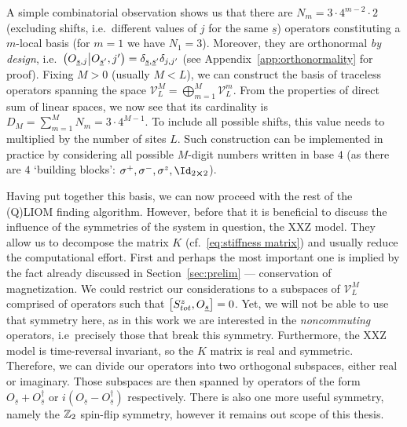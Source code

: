 A simple combinatorial observation shows us that there are \(N_m = 3\cdot 4^{m-2}\cdot 2\)
(excluding shifts, i.e.\ different values of \(j\) for the same \(\underline{s}\)) operators
constituting a \(m\)-local basis (for \(m = 1\) we have \(N_1 = 3\)). Moreover, they are orthonormal
\textit{by design}, i.e.\ \(\left(O_{\underline{s},j} \middle| O_{\underline{s}^{\prime}},j^{\prime}\right) =
\delta_{\underline{s},\underline{s}^{\prime}}\delta_{j,j^{\prime}}\) (see Appendix~\ref{app:orthonormality} for proof).
Fixing \(M>0\) (usually \(M<L\)), we can construct the basis of traceless operators spanning
the space \(\mathcal{V}_L^M = \bigoplus_{m=1}^{M} \mathcal{V}_L^m\). From the properties of 
direct sum of linear spaces, we now see that its cardinality is \(D_M = \sum_{m=1}^{M} N_m = 
 3 \cdot 4^{M-1}\). To include all possible shifts, this value needs to multiplied by
 the number of sites \(L\). Such construction can be implemented in practice by considering
 all possible \(M\)-digit numbers written in base \(4\) (as there are \(4\) `building blocks':
  \(\sigma^{+},\sigma^{-},\sigma^{z},\Id_{2\cross 2}\)). 

Having put together this basis, we can now proceed with the rest of the (Q)LIOM finding algorithm.
However, before that it is beneficial to discuss the influence of the symmetries of the system in question,
the XXZ model. They allow us to decompose the matrix \(K\) 
(cf.~\eqref{eq:stiffness matrix}) and usually reduce the computational effort. First and perhaps
the most important one is implied by the fact already discussed in Section~\ref{sec:prelim} ---
conservation of magnetization. We could restrict our considerations to a subspaces
of \(\mathcal{V}_L^M\) comprised of operators such that \(\comm{S_{tot}^z}{O_{\underline{s}}} = 0\).
Yet, we will not be able to use that symmetry here, as in this work we are interested 
in the \textit{noncommuting} operators, i.e\ precisely those that break this symmetry.
Furthermore, the XXZ model is time-reversal invariant, so the \(K\) matrix is real and symmetric.
Therefore, we can divide our operators into two orthogonal subspaces, either real or imaginary.
Those subspaces are then spanned by operators of the form 
\(O_{\underline{s}}+O^{\dagger}_{\underline{s}}\) or 
\(i(O_{\underline{s}}-O^{\dagger}_{\underline{s}})\) respectively. There is also one more
useful symmetry, namely the \(\mathbb{Z}_2\) spin-flip symmetry, however it remains out scope of
this thesis. 


